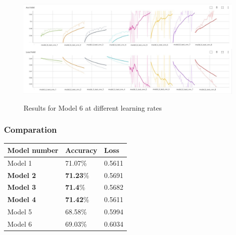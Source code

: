 



\begin{center}
    \begin{figure}[!h]
        \centering
        \includegraphics[width=\textwidth]{images/exp1_acc6+loss6.jpg}
        \label{fig:exp1_model6}
        \caption{Results for Model 6 at different learning rates}
    \end{figure}
\end{center}


\subsubsection{Comparation}
\begin{center}
    \begin{tabular}{|p{3cm}||p{3cm}|p{3cm}|  }
     \hline
    Model number	& Accuracy & Loss \\
     \hline
    Model 1 & 71.07\% & 0.5611\\
    \textbf{Model 2} & \textbf{71.23}\% & 0.5691\\
    \textbf{Model 3} & \textbf{71.4}\% & 0.5682\\
    \textbf{Model 4} & \textbf{71.42}\% & 0.5611\\
    Model 5 & 68.58\% & 0.5994\\
    Model 6 & 69.03\% & 0.6034\\
     \hline
    \end{tabular}
\end{center}

